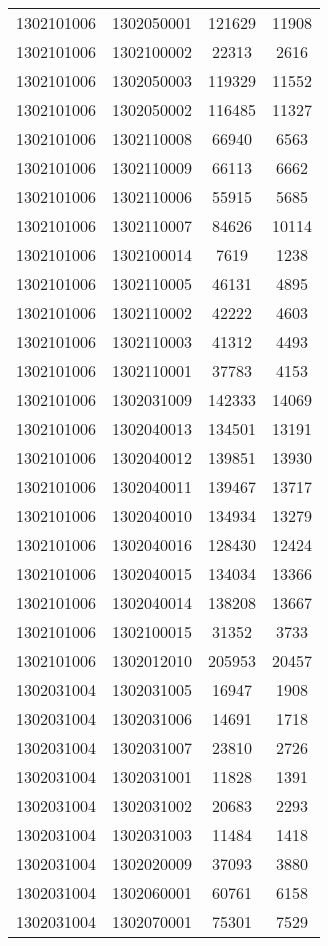 \begin{longtable}{llcc}
1302101006 & 1302050001 & 121629 & 11908\\
1302101006 & 1302100002 & 22313 & 2616\\
1302101006 & 1302050003 & 119329 & 11552\\
1302101006 & 1302050002 & 116485 & 11327\\
1302101006 & 1302110008 & 66940 & 6563\\
1302101006 & 1302110009 & 66113 & 6662\\
1302101006 & 1302110006 & 55915 & 5685\\
1302101006 & 1302110007 & 84626 & 10114\\
1302101006 & 1302100014 & 7619 & 1238\\
1302101006 & 1302110005 & 46131 & 4895\\
1302101006 & 1302110002 & 42222 & 4603\\
1302101006 & 1302110003 & 41312 & 4493\\
1302101006 & 1302110001 & 37783 & 4153\\
1302101006 & 1302031009 & 142333 & 14069\\
1302101006 & 1302040013 & 134501 & 13191\\
1302101006 & 1302040012 & 139851 & 13930\\
1302101006 & 1302040011 & 139467 & 13717\\
1302101006 & 1302040010 & 134934 & 13279\\
1302101006 & 1302040016 & 128430 & 12424\\
1302101006 & 1302040015 & 134034 & 13366\\
1302101006 & 1302040014 & 138208 & 13667\\
1302101006 & 1302100015 & 31352 & 3733\\
1302101006 & 1302012010 & 205953 & 20457\\
1302031004 & 1302031005 & 16947 & 1908\\
1302031004 & 1302031006 & 14691 & 1718\\
1302031004 & 1302031007 & 23810 & 2726\\
1302031004 & 1302031001 & 11828 & 1391\\
1302031004 & 1302031002 & 20683 & 2293\\
1302031004 & 1302031003 & 11484 & 1418\\
1302031004 & 1302020009 & 37093 & 3880\\
1302031004 & 1302060001 & 60761 & 6158\\
1302031004 & 1302070001 & 75301 & 7529\\

\end{longtable}

